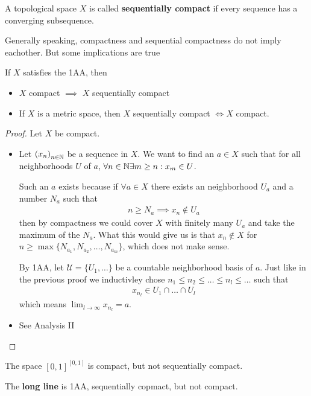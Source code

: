 \begin{dfn}[]
A topological space $X$ is called \textbf{sequentially compact} if every sequence has a converging subsequence.
\end{dfn}
Generally speaking, compactness and sequential compactness do not imply eachother.
But some implications are true

\begin{lem}[]
  If $X$ satisfies the 1AA, then
\begin{itemize}
  \item $X$ compact $\implies$ $X$ sequentially compact
  \item If $X$ is a metric space, then $X$ sequentially compact $\iff X$ compact.
\end{itemize}
\end{lem}
\begin{proof}
Let $X$ be compact.
\begin{itemize}
  \item Let $\left(x_{n}\right)_{n \in \mathbb{N}}$ be a sequence in $X$.
    We want to find an $a \in X$ such that for all neighborhoods $U$ of $a$, $\forall n \in \mathbb{N} \exists m \geq n: x_m \in U$.

    Such an $a$ exists because if $\forall a \in X$ there exists an neighborhood $U_a$ and a number $N_a$ such that
    \begin{align*}
      n \geq N_a \implies x_n \notin U_a
    \end{align*}
    then by compactness we could cover $X$ with finitely many $U_a$ and take the maximum of the $N_a$. What this would give us is that $x_n \notin X$ for $n \geq \max \{N_{a_1}, N_{a_2}, \ldots, N_{a_m}\}$, which does not make sense.

    By 1AA, let $\mathcal{U} = \{U_1, \ldots\}$ be a countable neighborhood basis of $a$.
    Just like in the previous proof we inductivley chose $n_1 \leq n_2 \leq \ldots \leq n_l \leq \ldots$ such that
    \begin{align*}
      x_{n_l} \in U_1 \cap \ldots \cap U_l
    \end{align*}
    which means $\lim_{l \to \infty} x_{n_l} = a$.

  \item  See Analysis II
\end{itemize}
\end{proof}


\begin{ex}[Counterexamples]
  The space $[0,1]^{[0,1]}$ is compact, but not sequentially compact.

  The \textbf{long line} is 1AA, sequentially copmact, but not compact.
\end{ex}

